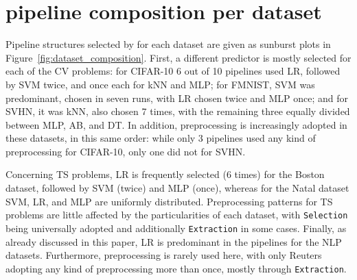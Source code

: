 \section{\isklearn pipeline composition per dataset}

Pipeline structures selected by \irace for each dataset are given as sunburst plots in Figure~\ref{fig:dataset_composition}. First, a different predictor is mostly selected for each of the CV problems: for CIFAR-10 6 out of 10 pipelines used LR, followed by SVM twice, and once each for kNN and MLP; for FMNIST, SVM was predominant, chosen in seven runs, with LR chosen twice and MLP once; and for SVHN, it was kNN, also chosen 7 times, with the remaining three equally divided between MLP, AB, and DT. In addition, preprocessing is increasingly adopted in these datasets, in this same order: while only 3 pipelines used any kind of preprocessing for CIFAR-10, only one did not for SVHN.

Concerning TS problems, LR is frequently selected (6 times) for the Boston dataset, followed by SVM (twice) and MLP (once), whereas for the Natal dataset SVM, LR, and MLP are uniformly distributed. Preprocessing patterns for TS problems are little affected by the particularities of each dataset, with \texttt{\small Selection} being universally adopted and additionally \texttt{\small Extraction} in some cases. Finally, as already discussed in this paper, LR is predominant in the pipelines for the NLP datasets. Furthermore, preprocessing is rarely used here, with only Reuters adopting any kind of preprocessing more than once, mostly through \texttt{\small Extraction}.

